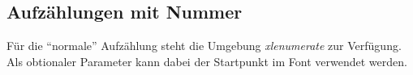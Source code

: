 \subsection{Aufzählungen mit Nummer}

Für die "`normale"' Aufzählung steht die Umgebung \emph{xlenumerate} zur Verfügung.
Als obtionaler Parameter kann dabei der Startpunkt im Font verwendet werden.


%
